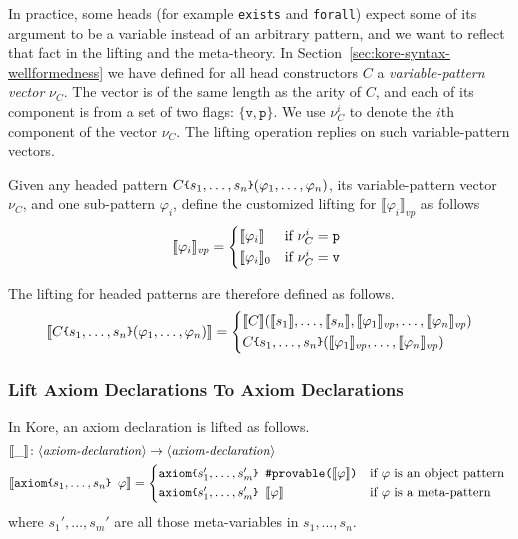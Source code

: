 \documentclass[UTF8,11pt]{article}
\theoremstyle{plain}
\theoremstyle{definition}
\theoremstyle{remark}
\newcommand{\parametric}[2]{{#1}\raisebox{.2ex}{\texttt{\footnotesize{\{}}}#2\raisebox{.2ex}{\texttt{\footnotesize{\}}}}}
\newcommand{\denote}[1]{\llbracket{#1}\rrbracket}
\newcommand{\sharpsymbol}{\#}
\newcommand{\Kdeduce}{\textup{\texttt{\sharpsymbol provable}}}
\newcommand{\slashsymbol}{\symbol{92}}
\newcommand{\slsh}[1]{\texttt{\slashsymbol#1}}
\newcommand{\slexists}{\slsh{exists}}
\newcommand{\slforall}{\slsh{forall}}
\newcommand{\ttv}{\texttt{v}}
\newcommand{\ttp}{\texttt{p}}
\newcommand{\itvp}{\mathit{vp}}
\newcommand{\syntacc}[1]{\text{$\langle$\textit{#1}$\rangle$}}
\begin{document}
In practice, some heads (for example {\slexists} and \slforall) expect some of 
its argument to be a variable instead of an arbitrary pattern, and we want to 
reflect that fact in the lifting and the meta-theory.
In Section~\ref{sec:kore-syntax-wellformedness} we have defined for all head 
constructors $C$ a \emph{variable-pattern vector} $\nu_C$.
The vector is of the same length as the arity of $C$, and each of its component 
is from a set of two flags: $\{ \ttv, \ttp \}$.
We use $\nu_C^i$ to denote the $i$th component of the vector $\nu_C$.
The lifting operation replies on such variable-pattern vectors.

Given any headed pattern 
$\parametric{C}{s_1,\dots,s_n}(\varphi_1,\dots,\varphi_n)$, its 
variable-pattern vector $\nu_C$, and one sub-pattern $\varphi_i$,
define the customized lifting for $\denote{\varphi_i}_{\itvp}$ 
as follows
\begin{align*}
\denote{\varphi_i}_\itvp =
\begin{cases*}
\denote{\varphi_i} & if $\nu_C^i = \ttp$ \\
\denote{\varphi_i}_0 & if $\nu_C^i = \ttv$
\end{cases*}
\end{align*}

The lifting for headed patterns are therefore defined as follows.
\begin{align*}
\denote{\parametric{C}{s_1,\dots,s_n}(\varphi_1,\dots,\varphi_n)} =
\begin{cases*}
\denote{C}(\denote{s_1},\dots,\denote{s_n},\denote{
	\varphi_1}_\itvp,\dots,\denote{\varphi_n}_\itvp)\\
\parametric{C}{s_1,\dots,s_n}(\denote{
	\varphi_1}_\itvp,\dots,\denote{\varphi_n}_\itvp)
\end{cases*}
\end{align*}

\subsubsection{Lift Axiom Declarations To Axiom Declarations}
In Kore, an axiom declaration is lifted as follows.
\begin{align*}
  &\denote{\_} \colon \syntacc{axiom-declaration} \to 
  \syntacc{axiom-declaration}
  \\
  &\denote{\texttt{\parametric{axiom}{$s_1,\dots,s_n$}
  		$\varphi$}} =
  	\begin{cases*}
  	\texttt{\parametric{axiom}{$s'_1,\dots,s'_m$} 
  	\Kdeduce($\denote{\varphi}$)} & 
  if $\varphi$ is an object pattern \\
  \texttt{\parametric{axiom}{$s'_1,\dots,s'_m$} $\denote{\varphi}$} & if
  $\varphi$ is a meta-pattern
  	\end{cases*}
\end{align*}
where $s_1',\dots,s_m'$ are all those meta-variables in $s_1,\dots,s_n$.
\end{document}
